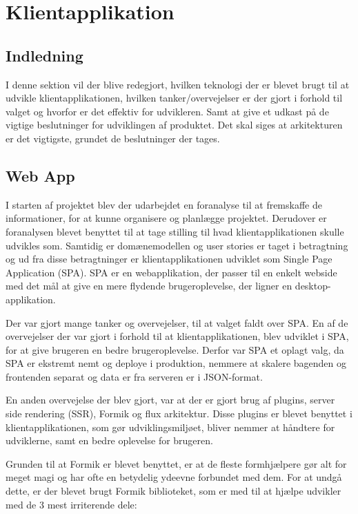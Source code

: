 \chapter{Klientapplikation}

\section{Indledning}
I denne sektion vil der blive redegjort, hvilken teknologi der er blevet brugt til at udvikle klientapplikationen, hvilken tanker/overvejelser er der gjort i forhold til valget og hvorfor er det effektiv for udvikleren. Samt at give et udkast på de vigtige beslutninger for udviklingen af produktet. Det skal siges at arkitekturen er det vigtigste, grundet de beslutninger der tages.

\section{Web App}
I starten af projektet blev der udarbejdet en foranalyse til at fremskaffe de informationer, for at kunne organisere og planlægge projektet. Derudover er foranalysen blevet benyttet til at tage stilling til hvad klientapplikationen skulle udvikles som. Samtidig er domænemodellen og user stories er taget i betragtning og ud fra disse betragtninger er klientapplikationen udviklet som Single Page Application (SPA). SPA er en webapplikation, der passer til en enkelt webside med det mål at give en mere flydende brugeroplevelse, der ligner en desktop-applikation. 

Der var gjort mange tanker og overvejelser, til at valget faldt over SPA. En af de overvejelser der var gjort i forhold til at klientapplikationen, blev udviklet i SPA, for at give brugeren en bedre brugeroplevelse. Derfor var SPA et oplagt valg, da SPA er ekstremt nemt og deploye i produktion, nemmere at skalere bagenden og frontenden separat og data er fra serveren er i JSON-format.

En anden overvejelse der blev gjort, var at der er gjort brug af plugins, server side rendering (SSR), Formik og flux arkitektur. Disse plugins er blevet benyttet i klientapplikationen, som gør udviklingsmiljøet, bliver nemmer at håndtere for udviklerne, samt en bedre oplevelse for brugeren.
 
Grunden til at Formik er blevet benyttet, er at de fleste formhjælpere gør alt for meget magi og har ofte en betydelig ydeevne forbundet med dem. For at undgå dette, er der blevet brugt Formik biblioteket, som er med til at hjælpe udvikler med de 3 mest irriterende dele:

